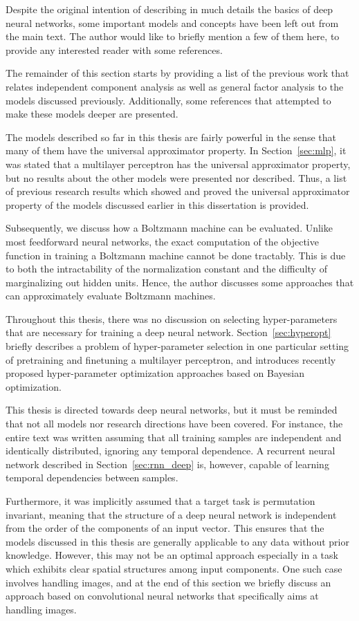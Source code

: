 \documentclass{now}
\begin{document}
Despite the original intention of describing in much
details the basics of deep neural networks,
some important models and concepts have been left out from
the main text. The author would like to briefly mention
a few of them here, to provide any interested reader with
some references.

The remainder of this section starts by providing a list of
the previous work that relates independent component
analysis as well as general factor analysis to the models
discussed previously.  Additionally, some references that
attempted to make these models deeper are presented.  

The models described so far in this thesis are fairly
powerful in the sense that many of them have the universal
approximator property. In Section~\ref{sec:mlp}, it was
stated that a multilayer perceptron has the universal
approximator property, but no results about the other models
were presented nor described. Thus, a list of previous
research results which showed and proved the universal approximator
property of the models discussed earlier in this
dissertation is provided.

Subsequently, we discuss how a Boltzmann machine can be
evaluated. Unlike most feedforward neural
networks, the exact computation of the objective function in
training a Boltzmann machine cannot be done tractably. This
is due to both the intractability of the normalization
constant and the difficulty of marginalizing out hidden
units. Hence, the author discusses some approaches that can
approximately evaluate Boltzmann machines.

Throughout this thesis, there was no discussion on selecting
hyper-parameters that are necessary for training a deep
neural network. Section~\ref{sec:hyperopt} briefly describes
a problem of hyper-parameter selection in one particular
setting of pretraining and finetuning a multilayer
perceptron, and introduces recently proposed
hyper-parameter optimization approaches based on Bayesian
optimization.

This thesis is directed towards deep neural networks, but it must
be reminded that not all models nor research directions have been
covered. For instance, the entire text was written assuming that
all training samples are independent and identically distributed,
ignoring any temporal dependence.  A recurrent neural network
described in Section~\ref{sec:rnn_deep} is, however, capable
of learning temporal dependencies between samples.

Furthermore, it was implicitly assumed that a target task is
permutation invariant, meaning that the structure of a deep
neural network is independent from the order of the
components of an input vector. This ensures that the models
discussed in this thesis are generally applicable to any
data without prior knowledge. However, this may not be an
optimal approach especially in a task which exhibits clear
spatial structures among input components. One such case
involves handling images, and at the end of this section we
briefly discuss an approach based on convolutional neural
networks that specifically aims at handling images.
\end{document}
